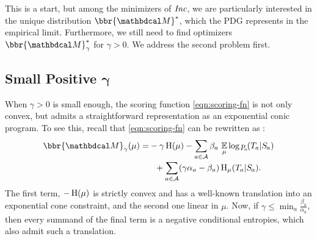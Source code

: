 \documentclass[twoside]{article}
\begin{document}
This is a start, but among the minimizers of $\mathit{Inc}$, we are particularly interested in the unique distribution $\bbr{\dg M}^*$, which the PDG represents in the empirical limit.
Furthermore, we still need to find optimizers $\bbr{\dg M}^*_\gamma$ for $\gamma > 0$.
We address the second problem first.

\subsection{%
    Small Positive
    \texorpdfstring{$\boldsymbol\gamma$}{gamma}%
} \label{sec:small-gamma}

When $\gamma > 0$ is small enough,
the scoring function \eqref{eqn:scoring-fn} is not only convex,
but admits a straightforward representation as an exponential conic program.
To see this, recall that \eqref{eqn:scoring-fn}
 can be rewritten as \parencite[Proposition 4.6]{pdg-aaai}:
\begin{equation}
    \begin{aligned}
        \bbr{\dg M}_\gamma(\mu) =
        &-\gamma\H(\mu) -
            \sum_{a \in \Ar}
                \beta_a\, \Ex_\mu
                    \log {p\ssub a(\Tgt a | \Src a)}
                \\[-0.5ex]
            &~~+ \sum_{a \in \Ar}
            (\gamma \alpha_a - \beta_a)
                \H_\mu (\Tgt a | \Src a).
    \end{aligned}
    \label{eq:altscore}
\end{equation}
The first term, $-\operatorname{\mathrm{H}}(\mu)$ is strictly convex and has a well-known
translation into an exponential cone constraint, and the second one linear in $\mu$.
Now, if $\gamma \le \min_{a} \frac{\beta_a}{\alpha_a}$, then every summand of the final term is a negative conditional entropies, which also admit such a translation.
\end{document}
